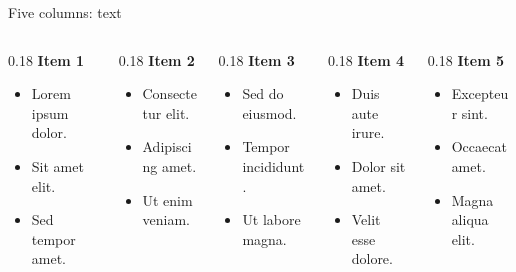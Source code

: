 \begin{frame}[t]{Five columns: text}
    \begin{columns}[T,onlytextwidth]
        \begin{column}{0.18\textwidth}
            \textbf{Item 1}
            \begin{itemize}
                \item Lorem ipsum dolor.
                \item Sit amet elit.
                \item Sed tempor amet.
            \end{itemize}
        \end{column}
        \begin{column}{0.18\textwidth}
            \textbf{Item 2}
            \begin{itemize}
                \item Consectetur elit.
                \item Adipiscing amet.
                \item Ut enim veniam.
            \end{itemize}
        \end{column}
        \begin{column}{0.18\textwidth}
            \textbf{Item 3}
            \begin{itemize}
                \item Sed do eiusmod.
                \item Tempor incididunt.
                \item Ut labore magna.
            \end{itemize}
        \end{column}
        \begin{column}{0.18\textwidth}
            \textbf{Item 4}
            \begin{itemize}
                \item Duis aute irure.
                \item Dolor sit amet.
                \item Velit esse dolore.
            \end{itemize}
        \end{column}
        \begin{column}{0.18\textwidth}
            \textbf{Item 5}
            \begin{itemize}
                \item Excepteur sint.
                \item Occaecat amet.
                \item Magna aliqua elit.
            \end{itemize}
        \end{column}
    \end{columns}
\end{frame}

